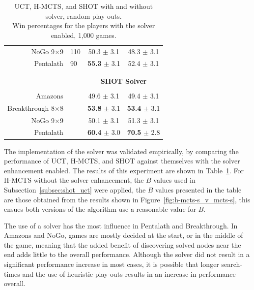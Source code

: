 \documentclass{icga}
\begin{document}
\begin{table}[ht]
{\begin{tabular}{rlcc}
NoGo 9$\times$9 &\multicolumn{1}{l|}{110} 			& 50.3 $\pm$ 3.1				& 48.3 $\pm$ 3.1 				\\ [.5mm] 
Pentalath &\multicolumn{1}{l|}{90} 		  			& {\bf{55.3}} $\pm$ 3.1			& 52.4 $\pm$ 3.1				\\ [.5mm] 
\multicolumn{2}{c|}{} \\ [-4mm]
\cline{1-4}
\multicolumn{2}{c|}{} \\ [-3mm]
\multicolumn{2}{c|}{} & \multicolumn{2}{c}{\textbf{SHOT Solver}} 													\\ [1mm]
\multicolumn{2}{c|}{} \\ [-4mm]
Amazons &\multicolumn{1}{l|}{}			    	& 49.6 $\pm$ 3.1 				& 49.4 $\pm$ 3.1 					\\ [.5mm] 
Breakthrough 8$\times$8 &\multicolumn{1}{l|}{}	& {\bf{53.8}} $\pm$ 3.1			& {\bf{53.4}} $\pm$ 3.1 			\\ [.5mm] 
NoGo 9$\times$9 &\multicolumn{1}{l|}{} 			& 50.1 $\pm$ 3.1				& 51.3 $\pm$ 3.1 					\\ [.5mm] 
Pentalath &\multicolumn{1}{l|}{} 		  		& {\bf{60.4}} $\pm$ 3.0			& {\bf{70.5}} $\pm$ 2.8 			\\ [.5mm] 
\hline
\end{tabular}
}
\vspace{3mm}
{\caption[H-MCTS, SHOT, and UCT with and without solver.]
{UCT, H-MCTS, and SHOT with and without solver, random play-outs. \\ Win percentages for the players with the solver enabled, 1,000 games.} \label{tab:solver_no_solver}}
\end{table}

The implementation of the solver was validated empirically, by comparing the performance of UCT, H-MCTS, and SHOT against themselves with the solver enhancement enabled. The results of this experiment are shown in Table~\ref{tab:solver_no_solver}. For H-MCTS without the solver enhancement, the $B$ values used in Subsection~\ref{subsec:shot_uct} were applied, the $B$ values presented in the table are those obtained from the results shown in Figure~\ref{fig:h-mcts-s_v_mcts-s}, this ensues both versions of the algorithm use a reasonable value for $B$.

The use of a solver has the most influence in Pentalath and Breakthrough. In Amazons and NoGo, games are mostly decided at the start, or in the middle of the game, meaning that the added benefit of discovering solved nodes near the end adds little to the overall performance. Although the solver did not result in a significant performance increase in most cases, it is possible that longer search-times and the use of heuristic play-outs results in an increase in performance overall.
\end{document}
